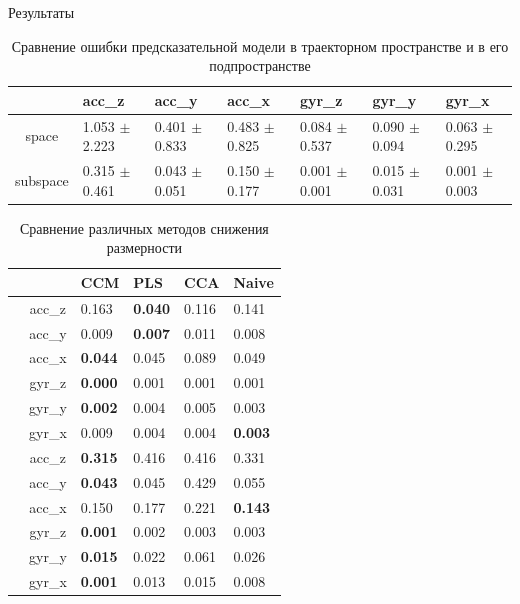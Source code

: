 \documentclass{beamer}
\begin{document}
	\begin{frame}{Результаты}
		\begin{table}[bhtp]
			\fontsize{4pt}{8pt}
			\selectfont
			\centering
			\caption{Сравнение ошибки предсказательной модели в траекторном пространстве и в его подпространстве}
			\label{tbl:space_and_subspace}
			\begin{tabularx}{\textwidth}{c|XXXXXX}
				\hline
				& acc\_z & acc\_y & acc\_x & gyr\_z & gyr\_y & gyr\_x \\
				\hline
				space & 1.053 $\pm$ 2.223 & 0.401 $\pm$ 0.833 & 0.483 $\pm$ 0.825 & 0.084 $\pm$ 0.537 & 0.090 $\pm$ 0.094 & 0.063 $\pm$ 0.295 \\
				subspace & 0.315 $\pm$ 0.461 & 0.043 $\pm$ 0.051 & 0.150 $\pm$ 0.177 & 0.001 $\pm$ 0.001	& 0.015 $\pm$ 0.031 & 0.001 $\pm$ 0.003 \\
				\hline
			\end{tabularx}
		\end{table}
	
		\begin{table}[bhtp]
			\tiny
			\centering
			\caption{Сравнение различных методов снижения размерности}
			\label{tbl:methods}
			\begin{tabular}{l|c|llll}
				\hline
				\multicolumn{2}{l}{\diaghead{\hskip4cm}{Целевой признак}{Метод}} \vline & CCM & PLS & CCA & Naive \\
				\hline
				\multirow{6}{*}{\rotatebox[origin=c]{90}{cyclic}} & acc\_z & 0.163 & \textbf{0.040} & 0.116 & 0.141 \\
				& acc\_y & 0.009 & \textbf{0.007} & 0.011 & 0.008 \\
				& acc\_x & \textbf{0.044} & 0.045 & 0.089 & 0.049 \\
				& gyr\_z & \textbf{0.000} & 0.001 & 0.001 & 0.001 \\
				& gyr\_y & \textbf{0.002} & 0.004 & 0.005 & 0.003 \\
				& gyr\_x & 0.009 & 0.004 & 0.004 & \textbf{0.003} \\
				\hline
				\multirow{6}{*}{\rotatebox[origin=c]{90}{chaotic}} & acc\_z & \textbf{0.315} & 0.416 & 0.416 & 0.331 \\
				& acc\_y & \textbf{0.043} & 0.045 & 0.429 & 0.055 \\
				& acc\_x & 0.150 & 0.177 & 0.221 & \textbf{0.143} \\
				& gyr\_z & \textbf{0.001} & 0.002 & 0.003 & 0.003 \\
				& gyr\_y & \textbf{0.015} & 0.022 & 0.061 & 0.026 \\
				& gyr\_x & \textbf{0.001} & 0.013 & 0.015 & 0.008 \\
				\hline   
			\end{tabular}
		\end{table}
	\end{frame}
\end{document}
